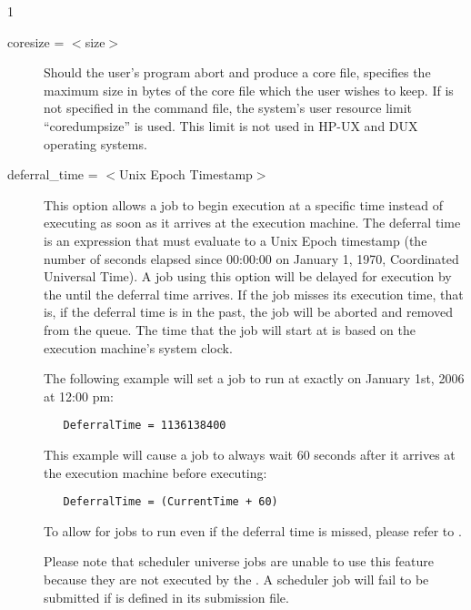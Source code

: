 \begin{ManPage}{\label{man-condor-submit}}{1}
\begin{description}

\item[coresize = $<$size$>$] Should the user's program abort and produce
a core file,  specifies the maximum size in bytes of the
core file which the user wishes to keep. If  is not
specified in the command file, the system's user resource limit
\mbox{``coredumpsize''} is used.
This limit is not used in HP-UX and DUX operating systems. 


\item[deferral\_time = $<$Unix Epoch Timestamp$>$]
This option allows a job to begin execution at a specific time
instead of executing as soon as it arrives at the execution
machine. The deferral time is an expression that must
evaluate to a Unix Epoch timestamp (the number of
seconds elapsed since 00:00:00 on January 1, 1970, Coordinated
Universal Time). A job using this option will be delayed for
execution by the  until the deferral
time arrives. If the job misses its execution time, that is, if
the deferral time is in the past, the job will be aborted and
removed from the queue. The time that the job will start at is 
based on the execution machine's system clock.

The following example will set a job to run at exactly on
January 1st, 2006 at 12:00 pm:

\begin{verbatim} 
   DeferralTime = 1136138400
\end{verbatim} 

This example will cause a job to always wait 60 seconds after 
it arrives at the execution machine before executing:

\begin{verbatim} 
   DeferralTime = (CurrentTime + 60)
\end{verbatim}

To allow for jobs to run even if the deferral time is missed,
please refer to .

Please note that scheduler universe jobs are unable to use this
feature because they are not executed by the .
A scheduler job will fail to be submitted if 
is defined in its submission file.



\end{description}
\end{ManPage}
